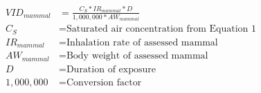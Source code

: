 \documentclass[fleqn, oneside, 11pt]{article}%
\begin{document}
\begin{preview}
\begin{align*}%
VID_{mammal} & = \frac{C_{S}*IR_{mammal}*D}{1,000,000*AW_{mammal}}\nonumber \\
C_{S} & =  \text{Saturated air concentration from Equation 1} \nonumber \\
IR_{mammal} & =  \text{Inhalation rate of assessed mammal} \nonumber \\
AW_{mammal} & =  \text{Body weight of assessed mammal} \nonumber \\
D & =  \text{Duration of exposure} \nonumber \\
1,000,000 & =  \text{Conversion factor} \nonumber \\
\end{align*} 
\end{preview}
\end{document}
